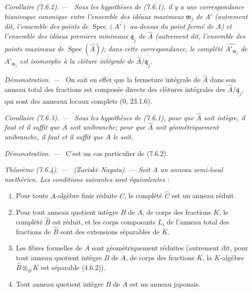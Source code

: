 \documentclass[10pt,oneside]{book}
\makeatletter
\newenvironment{theorem}[1][]{%
  \par\medskip\noindent\itshape Théorème (#1). ---\ }{\par}
\newenvironment{corollary}[1][]{%
  \par\medskip\noindent\itshape Corollaire (#1). ---\ }{\par}
\newenvironment{proof}{%
  \par\medskip\noindent\textit{Démonstration. ---\ }}{\par}
\newcommand{\EGAReaderTarget}[2]{\hypertarget{#1}{}\@bsphack\begingroup\def\@currentHref{#1}\label{#2}\endgroup\@esphack}
\makeatother
\begin{document}
\begin{corollary}[7.6.2]
\label{IV.2.s7.6.2-fr}
Sous les hypothèses de (7.6.1), il y a une correspondance biunivoque canonique
entre l'ensemble des idéaux maximaux $\mathfrak m_j$ de $A'$ (autrement dit,
l'ensemble des points de $\operatorname{Spec}(A')$ au-dessus du point fermé de
$A$) et l'ensemble des idéaux premiers minimaux $\mathfrak q_j$ de
$\widehat A$ (autrement dit, l'ensemble des points maximaux de
$\operatorname{Spec}(\widehat A)$); dans cette correspondance, le complété
$\widehat{A'_{\mathfrak m_j}}$ de $A'_{\mathfrak m_j}$ est isomorphe à la
clôture intégrale de $\widehat A/\mathfrak q_j$.
\end{corollary}

\begin{proof}
On sait en effet que la fermeture intégrale de $\widehat A$ dans son anneau
total des fractions est composée directe des clôtures intégrales des
$\widehat A/\mathfrak q_j$, qui sont des anneaux locaux complets (0, 23.1.6).
\end{proof}

\begin{corollary}[7.6.3]
\label{IV.2.s7.6.3-fr}
Sous les hypothèses de (7.6.1), pour que $\widehat A$ soit intègre, il faut et
il suffit que $A$ soit unibranche; pour que $\widehat A$ soit géométriquement
unibranche, il faut et il suffit que $A$ le soit.
\end{corollary}

\begin{proof}
C'est un cas particulier de (7.6.2).
\end{proof}

\begin{theorem}[7.6.4]
\EGAReaderTarget{ega4.c04.thm.7-6-4}{IV.2.s7.6.4-fr}
(Zariski--Nagata). --- Soit $A$ un anneau semi-local noethérien. Les conditions
suivantes sont équivalentes :
\begin{enumerate}
\item[\emph{a)}] Pour toute $A$-algèbre finie réduite $C$, le complété
$\widehat C$ est un anneau réduit.
\item[\emph{a$'$)}] Pour tout anneau quotient intègre $B$ de $A$, de corps des
fractions $K$, le complété $\widehat B$ est réduit, et les corps composants
$L_i$ de l'anneau total des fractions de $\widehat B$ sont des extensions
séparables de $K$.
\item[\emph{a$''$)}] Les fibres formelles de $A$ sont géométriquement réduites
(autrement dit, pour tout anneau quotient intègre $B$ de $A$, de corps des
fractions $K$, la $K$-algèbre $\widehat B\otimes_BK$ est séparable (4.6.2)).
\item[\emph{b)}] Tout anneau quotient intègre $B$ de $A$ est un anneau
japonais.
\end{enumerate}
\end{theorem}
\end{document}
